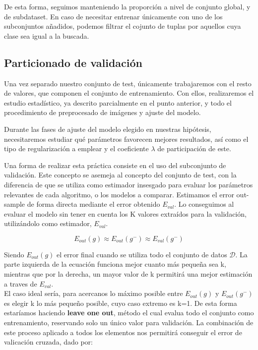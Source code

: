 De esta forma, seguimos manteniendo la proporción a nivel de conjunto global, y de subdataset. En caso de necesitar entrenar únicamente con uno de los subconjuntos añadidos, podemos filtrar el cojunto de tuplas por aquellos cuya clase sea igual a la buscada.

\subsection{Particionado de validación}

Una vez separado nuestro conjunto de test, únicamente trabajaremos con el resto de valores, que componen el conjunto de entrenamiento. Con ellos, realizaremos el estudio estadístico, ya descrito parcialmente en el punto anterior, y todo el procedimiento de preprocesado de imágenes y ajuste del modelo.

Durante las fases de ajuste del modelo elegido en nuestras hipótesis, necesitaremos estudiar qué parámetros favorecen mejores resultados, así como el tipo de regularización a emplear y el coeficiente $\lambda$ de participación de este.

Una forma de realizar esta práctica consiste en el uso del subconjunto de validación. Este concepto se asemeja al concepto del conjunto de test, con la diferencia de que se utiliza como estimador insesgado para evaluar los parámetros relevantes de cada algoritmo, o los modelos a comparar. Estimamos el error out-sample de forma directa mediante el error obtenido $E_{val}$. Lo conseguimos al evaluar el modelo sin tener en cuenta los K valores extraídos para la validación, utilizándolo como estimador, $E_{val}$.

$$E_{out}(g) \approx E_{out}(g^-) \approx E_{val}(g^-)$$

Siendo $E_{out}(g)$ el error final cuando se utiliza todo el conjunto de datos $\mathcal D$.
La parte izquierda de la ecuación funciona mejor cuanto más pequeña sea k, mientras que por la derecha, un mayor valor de k permitirá una mejor estimación a traves de $E_{val}$.\\

El caso ideal sería, para acercanos lo máximo posible entre $E_{out}(g)$ y $ E_{out}(g^-)$ es elegir k lo más pequeño posible, cuyo caso extremo es k=1. De esta forma estaríamos haciendo \textbf{leave one out}, método el cual evalua todo el conjunto como entrenamiento, reservando solo un único valor para validación. La combinación de este proceso aplicado a todos los elementos nos permitirá conseguir el error de valicación cruzada, dado por:

